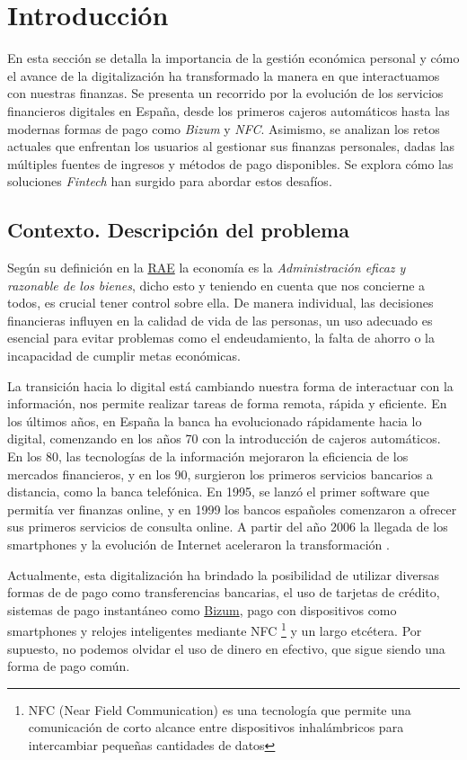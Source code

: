 \chapter{Introducción}
En esta sección se detalla la importancia de la gestión económica personal y cómo el avance de la digitalización ha transformado la manera en que interactuamos con nuestras finanzas. Se presenta un recorrido por la evolución de los servicios financieros digitales en España, desde los primeros cajeros automáticos hasta las modernas formas de pago como \textit{Bizum} y \textit{NFC}. Asimismo, se analizan los retos actuales que enfrentan los usuarios al gestionar sus finanzas personales, dadas las múltiples fuentes de ingresos y métodos de pago disponibles. Se explora cómo las soluciones \textit{Fintech} han surgido para abordar estos desafíos.

\section{Contexto. Descripción del problema} 
Según su definición en la \href{https://dle.rae.es/economía}{RAE} la economía es la 
\textit{Administración eficaz y razonable de los bienes}, dicho esto y teniendo en 
cuenta que nos concierne a todos, es crucial tener control sobre ella. 
De manera individual, las decisiones financieras influyen en la calidad de vida de las personas,
un uso adecuado es esencial para evitar problemas como el endeudamiento, la 
falta de ahorro o la incapacidad de cumplir metas económicas.

La transición hacia lo digital está cambiando nuestra forma de interactuar con 
la información, nos permite realizar tareas de forma remota, rápida y eficiente. 
En los últimos años, en España la banca ha evolucionado rápidamente hacia lo digital, comenzando en los años 70 con la introducción de cajeros automáticos. En los 80, las tecnologías de la información mejoraron la eficiencia de los mercados financieros, y en los 90, surgieron los primeros servicios bancarios a distancia, como la banca telefónica. En 1995, se lanzó el primer software que permitía ver finanzas online, y en 1999 los bancos españoles comenzaron a ofrecer sus primeros servicios de consulta online. A partir del año 2006 la llegada de los smartphones y la evolución de Internet aceleraron la transformación \cite{hebrero2022fintech}.

Actualmente, esta digitalización ha brindado la posibilidad de utilizar diversas formas de de pago como transferencias bancarias, el uso de tarjetas de crédito, sistemas de pago instantáneo como \href{https://bizum.es/}{Bizum}, pago con dispositivos como smartphones y relojes inteligentes mediante NFC \footnote{NFC (Near Field Communication) es una tecnología que permite una comunicación de corto alcance entre dispositivos inhalámbricos para intercambiar pequeñas cantidades de datos} y un largo etcétera. Por supuesto, no podemos olvidar el uso de dinero en efectivo, que sigue siendo una forma de pago común. 

